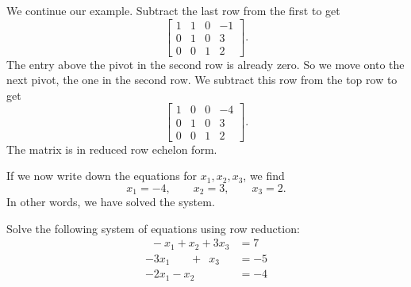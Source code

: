 We continue our example.
Subtract the last row from the first to get
\begin{equation*}
\left[
\begin{array}{ccc|c}
1 & 1 & 0 & -1 \\
0 & 1 & 0 & 3 \\
0 & 0 & 1 & 2 
\end{array}
\right] .
\end{equation*}
The entry above the pivot in the second row is already zero.
So we move onto the next pivot, the one in the second row.  We subtract
this row from the top row to get
\begin{equation*}
\left[
\begin{array}{ccc|c}
1 & 0 & 0 & -4 \\
0 & 1 & 0 & 3 \\
0 & 0 & 1 & 2 
\end{array}
\right] .
\end{equation*}
The matrix is in reduced row echelon form.

If we now write down the equations for $x_1,x_2,x_3$, we find
\begin{equation*}
x_1 = -4, \qquad x_2 = 3, \qquad x_3 = 2 .
\end{equation*}
In other words, we have solved the system.

\begin{example}
Solve the following system of equations using row reduction:
\begin{equation*}
\begin{split}
\phantom{9} -x_1 + x_2 + 3x_3 &= 7 \\
-3x_1 \phantom{+x_2} + \phantom{9} x_3 &= -5 \\
-2x_1 - x_2 &= -4
\end{split}
\end{equation*}
\end{example}


